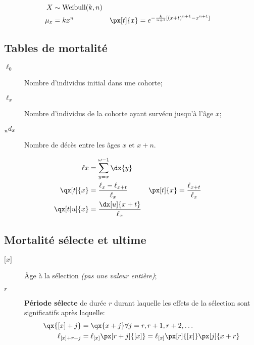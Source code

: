\documentclass[10pt, french]{article}
\begin{document}
\begin{multicols*}{3}
\begin{definitionNOHFILLsub}
\begin{align*}
	X &\sim \text{Weibull}(k, n) \\
	\mu_x &= k x^n	&
	\px[t]{x} &= e^{-\frac{k}{n + 1}[(x + t)^{n + 1} - x^{n + 1}]}
\end{align*}
\end{definitionNOHFILLsub}


\columnbreak
\subsection{Tables de mortalité}
\begin{distributions}[Notation]
\begin{description}
	\item[$\ell_{0}$]	Nombre d'individus initial dans une cohorte;
	\item[$\ell_{x}$]	Nombre d'individus de la cohorte ayant survécu jusqu'à l'âge $x$;
	\item[$\prescript{}{n}d_{x}$]	Nombre de décès entre les âges $x$ et $x + n$.
\end{description}
\end{distributions}

\begin{align*}
	\ell{x} 
	&=	\sum_{y = x}^{\omega - 1} \dx{y}	\\
	\qx[t]{x} 
	&=	\frac{\ell_x - \ell_{x+t}}{\ell_x}	&
	\px[t]{x} 
	&=	\frac{\ell_{x+t}}{\ell_x}	\\
	\qx[t|u]{x} 
	&=	\frac{\dx[u]{x+t}}{\ell_x}
\end{align*}



\subsection{Mortalité sélecte et ultime}
\begin{distributions}[Notation]
\begin{description}
	\item[${[}x{]}$]	Âge à la sélection \textit{(pas une valeur entière)};
	\item[$r$]	\textbf{Période sélecte} de durée $r$ durant laquelle les effets de la sélection sont significatifs après laquelle:
		\begin{align*}
		\qx{[x] + j} 
		&= \qx{x + j} \forall j = r, r + 1, r + 2, \dots	\\
		\ell_{[x] + r + j} 
		&= \ell_{[x]} \px[r + j]{[x]} = \ell_{[x]} \px[r]{[x]} \px[j]{x + r}
		\end{align*}
\end{description}
\end{distributions}


\end{multicols*}
\end{document}
